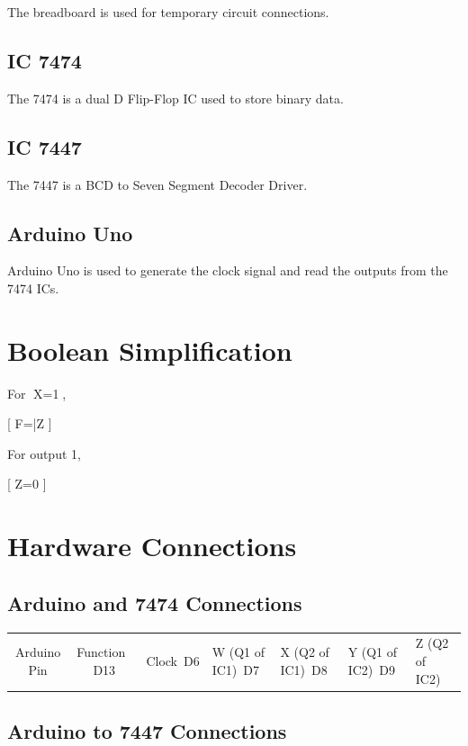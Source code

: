 \documentclass[a4paper,12pt]{article}
\begin{document}
The breadboard is used for temporary circuit connections.

\subsection{IC 7474}

The 7474 is a dual D Flip-Flop IC used to store binary data.

\subsection{IC 7447}

The 7447 is a BCD to Seven Segment Decoder Driver.

\subsection{Arduino Uno}

Arduino Uno is used to generate the clock signal and read the outputs from the 7474 ICs.

\section{Boolean Simplification}

For X=1,

[
F=\bar{Z}
]

For output 1,

[
Z=0
]

\section{Hardware Connections}

\subsection{Arduino and 7474 Connections}

\begin{center}
\begin{tabular}{|c|c|}
\hline
Arduino Pin & Function\
\hline
D13 & Clock\
D6 & W (Q1 of IC1)\
D7 & X (Q2 of IC1)\
D8 & Y (Q1 of IC2)\
D9 & Z (Q2 of IC2)\
\hline
\end{tabular}
\end{center}

\subsection{Arduino to 7447 Connections}
\end{document}
